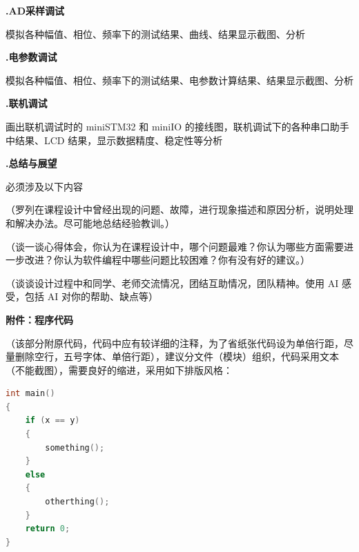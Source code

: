 \documentclass[UTF8,a4paper,zihao=-4,fontset=macnew]{ctexart}
\newcommand{\notepara}[2]{%
  {\setlength{\leftskip}{2em}\setlength{\parindent}{0pt}\color{#1}#2\par}%
}
\newcommand{\bluepara}[1]{\notepara{blue}{#1}}
\newcommand{\redpara}[1]{\notepara{red}{#1}}
\newcommand{\deepbluepara}[1]{\notepara{deepblue}{#1}}
\newcommand{\sectiontitle}[2]{%
  \vspace*{-0.32cm}%
  {\noindent\heiti\bfseries\fontsize{18pt}{20pt}\selectfont #1.\quad #2\par}
  \vspace{0.50cm}
}
\newcommand{\subsectiontitle}[2]{%
  \vspace{0.34cm}
  {\noindent\heiti\bfseries\fontsize{16pt}{18pt}\selectfont #1.\quad #2\par}
  \vspace{0.54cm}
}
\begin{document}
\label{sec:debug-ad}
\subsectiontitle{7.3}{AD采样调试}
\deepbluepara{模拟各种幅值、相位、频率下的测试结果、曲线、结果显示截图、分析}

\label{sec:debug-calculation}
\subsectiontitle{7.4}{电参数调试}
\deepbluepara{模拟各种幅值、相位、频率下的测试结果、电参数计算结果、结果显示截图、分析}

\label{sec:debug-online}
\subsectiontitle{7.5}{联机调试}
\deepbluepara{画出联机调试时的 miniSTM32 和 miniIO 的接线图，联机调试下的各种串口助手中结果、LCD 结果，显示数据精度、稳定性等分析}

\clearpage

\label{sec:summary}
\sectiontitle{8}{总结与展望}
\deepbluepara{必须涉及以下内容}

\bluepara{（罗列在课程设计中曾经出现的问题、故障，进行现象描述和原因分析，说明处理和解决办法。尽可能地总结经验教训。）}

\bluepara{（谈一谈心得体会，你认为在课程设计中，哪个问题最难？你认为哪些方面需要进一步改进？你认为软件编程中哪些问题比较困难？你有没有好的建议。）}

\bluepara{（谈谈设计过程中和同学、老师交流情况，团结互助情况，团队精神。使用 AI 感受，包括 AI 对你的帮助、缺点等）}

\clearpage

\label{sec:appendix}
\vspace*{0.17cm}
{\noindent\heiti\bfseries\fontsize{16pt}{18pt}\selectfont 附件：程序代码\par}
\vspace{0.45cm}
\redpara{（该部分附原代码，代码中应有较详细的注释，为了省纸张代码设为单倍行距，尽量删除空行，五号字体、单倍行距），建议分文件（模块）组织，代码采用文本（不能截图），需要良好的缩进，采用如下排版风格：}

\begin{lstlisting}[style=appendixcode,language=C]
int main()
{
    if (x == y)
    {
        something();
    }
    else
    {
        otherthing();
    }
    return 0;
}
\end{lstlisting}
\end{document}
